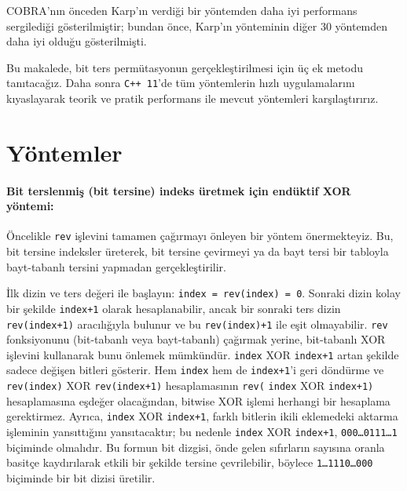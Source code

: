\documentclass[10pt]{article}
\begin{document}
COBRA'n{\i}n \"{o}nceden Karp'{\i}n verdi\u{g}i bir y\"{o}ntemden daha iyi performans sergiledi\u{g}i
 g\"{o}sterilmi\c{s}tir\cite{carter:towards};
bundan \"{o}nce, Karp'{\i}n y\"{o}nteminin di\u{g}er 30 y\"{o}ntemden daha 
iyi oldu\u{g}u g\"{o}sterilmi\c{s}ti\cite{karp:bit}.\newline

Bu makalede, bit ters perm\"{u}tasyonun ger\c{c}ekle\c{s}tirilmesi i\c{c}in \"{u}\c{c} ek metodu tan{\i}taca\u{g}{\i}z.
Daha sonra {\tt C++ 11}'de t\"{u}m y\"{o}ntemlerin h{\i}zl{\i} uygulamalar{\i}n{\i} k{\i}yaslayarak teorik
ve pratik performans ile mevcut y\"{o}ntemleri kar\c{s}{\i}la\c{s}t{\i}r{\i}r{\i}z.


\section*{Y\"{o}ntemler}

\paragraph{Bit terslenmi\c{s} (bit tersine) indeks \"{u}retmek i\c{c}in end\"{u}ktif XOR y\"{o}ntemi:}
\"{O}ncelikle {\tt rev} i\c{s}levini tamamen \c{c}a\u{g}{\i}rmay{\i} \"{o}nleyen bir y\"{o}ntem \"{o}nermekteyiz.
Bu, bit tersine indeksler \"{u}reterek, bit tersine \c{c}evirmeyi ya da 
bayt tersi bir tabloyla bayt-tabanl{\i} tersini yapmadan ger\c{c}ekle\c{s}tirilir.

\.{I}lk dizin ve ters de\u{g}eri ile ba\c{s}lay{\i}n: {\tt index =  rev(index) = 0}. 
Sonraki dizin kolay bir \c{s}ekilde {\tt  index+1} olarak hesaplanabilir, ancak bir
sonraki ters dizin {\tt  rev(index+1)} arac{\i}l{\i}\u{g}{\i}yla bulunur ve bu {\tt  rev(index)+1}
ile e\c{s}it olmayabilir. {\tt rev} fonksiyonunu (bit-tabanl{\i} veya bayt-tabanl{\i})
\c{c}a\u{g}{\i}rmak yerine, bit-tabanl{\i} XOR i\c{s}levini kullanarak bunu \"{o}nlemek m\"{u}mk\"{u}nd\"{u}r.
{\tt index} XOR {\tt index+1} artan \c{s}ekilde sadece  de\u{g}i\c{s}en bitleri g\"{o}sterir.
Hem {\tt index} hem de {\tt index+1}'i geri d\"{o}nd\"{u}rme ve {\tt rev(index)} XOR 
{\tt  rev(index+1)} hesaplamas{\i}n{\i}n {\tt rev(} {\tt index} XOR {\tt index+1)} 
hesaplamas{\i}na e\c{s}de\u{g}er olaca\u{g}{\i}ndan, bitwise XOR i\c{s}lemi herhangi bir hesaplama 
gerektirmez. Ayr{\i}ca, {\tt index} XOR {\tt index+1}, farkl{\i} bitlerin ikili 
eklemedeki aktarma i\c{s}leminin yans{\i}tt{\i}\u{g}{\i}n{\i} yans{\i}tacakt{\i}r; bu nedenle {\tt index} 
XOR {\tt  index+1}, {\tt 000\ldots 0111\ldots 1} bi\c{c}iminde olmal{\i}d{\i}r. Bu 
formun bit dizgisi, \"{o}nde gelen s{\i}f{\i}rlar{\i}n say{\i}s{\i}na oranla basit\c{c}e 
kayd{\i}r{\i}larak etkili bir \c{s}ekilde tersine \c{c}evrilebilir, b\"{o}ylece
{\tt 1\ldots 1110\ldots 000} bi\c{c}iminde bir bit dizisi \"{u}retilir.
\end{document}
